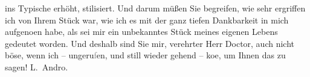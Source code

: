 \begin{ledgroupsized}[t]{13cm}
               ins Typische erhöht, stilisiert. Und darum müßen Sie begreifen, wie sehr ergriffen
               ich von Ihrem Stück war, wie
               ich {\pb}es mit der ganz tiefen Dankbarkeit in mich aufgeno{\geminationm}en habe, als sei mir ein unbekanntes Stück meines
               eigenen Lebens gedeutet worden. Und deshalb sind Sie mir, verehrter Herr Doctor, auch
               nicht böse, wenn ich – ungeru\textcolor{gray}{f}en, und still wieder gehend – ko{\geminationm}e, um Ihnen das zu sagen!\pend
           \pstart \spacefill\mbox{L. Andro.}\pend{}
         
         \endnumbering{}\end{ledgroupsized}  \newcommand{\dateiname}{L02570}\newcommand{\titel}{Therese Rie-Andro an Arthur Schnitzler, 29. 11. 1912}\newcommand{\editorInnen}{Martin Anton Müller und Gerd-Hermann Susen}
      